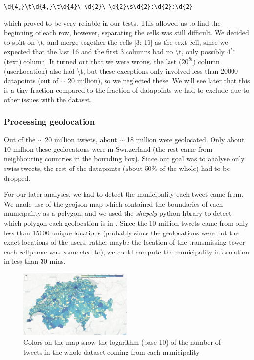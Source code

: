 \begin{Verbatim}[frame=single,fontsize=\scriptsize]
  \d{4,}\t\d{4,}\t\d{4}\-\d{2}\-\d{2}\s\d{2}:\d{2}:\d{2}
\end{Verbatim}

which proved to be very reliable in our tests. This allowed us to find the beginning of each row, however, separating the cells was still difficult. We decided to split on \textbackslash t, and merge together the cells [3:-16] as the text cell, since we expected that the last 16 and the first 3 columns had no \textbackslash t, only possibly $4^{th}$ (text) column. It turned out that we were wrong, the last ($20^{th}$) column (userLocation) also had \textbackslash t, but these exceptions only involved less than 20000 datapoints (out of $\sim$ 20 million), so we neglected these. We will see later that this is a tiny fraction compared to the fraction of datapoints we had to exclude due to other issues with the dataset.

\subsubsection{Processing geolocation}
\label{pre_geo}

Out of the $\sim$ 20 million tweets, about $\sim$ 18 million were geolocated. Only about 10 million these geolocations were in Switzerland (the rest came from neighbouring countries in the bounding box). Since our goal was to analyse only swiss tweets, the rest of the datapoints (about 50\% of the whole) had to be dropped.

For our later analyses, we had to detect the municipality each tweet came from. We made use of the geojson map which contained the boundaries of each  municipality as a polygon, and we used the \textit{shapely} python library to detect which polygon each geolocation is in \cite{shapely}. Since the 10 million tweets came from only less than 15000 unique locations (probably since the geolocations were not the exact locations of the users, rather maybe the location of the transmissing tower each cellphone was connected to), we could compute the municipality information in less than 30 mins.

\begin{figure}[h]
  \includegraphics[width=0.5\textwidth]{images/all_tweet_map.png}
  \caption{Colors on the map show the logarithm (base 10) of the number of tweets in the whole dataset coming from each municipality}
  \label{all_tweet_map}
\end{figure}


